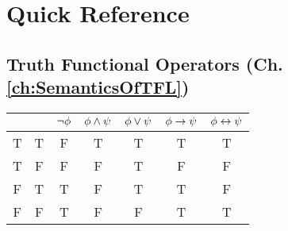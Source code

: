 \chapter[Quick Reference]{Quick Reference}
\section*{Truth Functional Operators (Ch. \ref{ch:SemanticsOfTFL})}


\begin{center}
\begin{tabular}{c c|c|c|c|c|c}
\meta{\phi} & \meta{\psi} & $\neg \mathcal{\phi}$ & $\mathcal{\phi}\wedge\mathcal{\psi}$ & $\mathcal{\phi}\vee\mathcal{\psi}$ & $\mathcal{\phi}\rightarrow\mathcal{\psi}$ & $\mathcal{\phi}\leftrightarrow\mathcal{\psi}$\\
\hline
T & T & F & T & T & T & T\\
T & F & F & F & T & F & F\\
F & T & T & F & T & T & F\\
F & F & T & F & F & T & T
\end{tabular}
\end{center}



